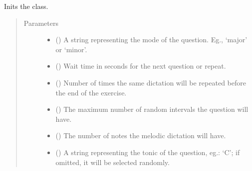 \documentclass[letterpaper,10pt,english]{sphinxmanual}
\begin{document}
\begin{fulllineitems}
\begin{fulllineitems}
\label{\detokenize{index:birdears.questions.instrumentaldictation.InstrumentalDictationQuestion.__init__}}
Inits the class.
\begin{quote}\begin{description}
\item[{Parameters}] \leavevmode\begin{itemize}
\item {} 
 () \textendash{} A string representing the mode of the question.
Eg., ‘major’ or ‘minor’.

\item {} 
 () \textendash{} Wait time in seconds for the next question or
repeat.

\item {} 
 () \textendash{} Number of times the same dictation will be
repeated before the end of the exercise.

\item {} 
 () \textendash{} The maximum number of random intervals the
question will have.

\item {} 
 () \textendash{} The number of notes the melodic dictation will have.

\item {} 
 () \textendash{} A string representing the tonic of the question,
eg.: ‘C’; if omitted, it will be selected randomly.


\end{itemize}
\end{description}
\end{quote}
\end{fulllineitems}
\end{fulllineitems}
\end{document}
